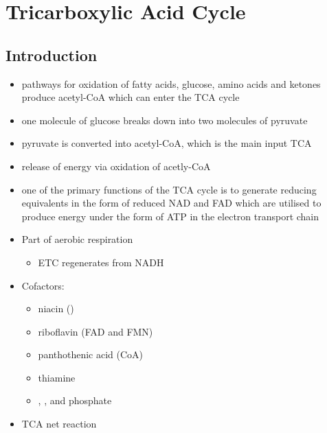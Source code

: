 \documentclass{scrartcl}
\begin{document}
\section{Tricarboxylic Acid Cycle}
\label{sec:org61f07ca}
\subsection{Introduction}
\label{sec:org79eef05}
\begin{itemize}
\item pathways for oxidation of fatty acids, glucose, amino acids and
ketones produce acetyl-CoA which can enter the TCA cycle
\item one molecule of glucose breaks down into two molecules of pyruvate
\item pyruvate is converted into acetyl-CoA, which is the main input TCA
\item release of energy via oxidation of acetly-CoA
\item one of the primary functions of the TCA cycle is to generate
reducing equivalents in the form of reduced NAD and FAD which are
utilised to produce energy under the form of ATP in the electron
transport chain
\end{itemize}

\centering
{}
\begin{itemize}
\item Part of aerobic respiration
\begin{itemize}
\item ETC regenerates  from NADH
\end{itemize}
\item Cofactors:
\begin{itemize}
\item niacin ()
\item riboflavin (FAD and FMN)
\item panthothenic acid (CoA)
\item thiamine
\item {}, ,  and phosphate
\end{itemize}

\item TCA net reaction
\end{itemize}

{\tiny{}}
\end{document}
